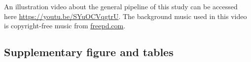 An illustration video about the general pipeline of this study can be accessed here \url{https://youtu.be/SYuOCVqgtrU}. The background music used in this video is copyright-free music from \url{freepd.com}.

\subsection{Supplementary figure and tables}








%   


